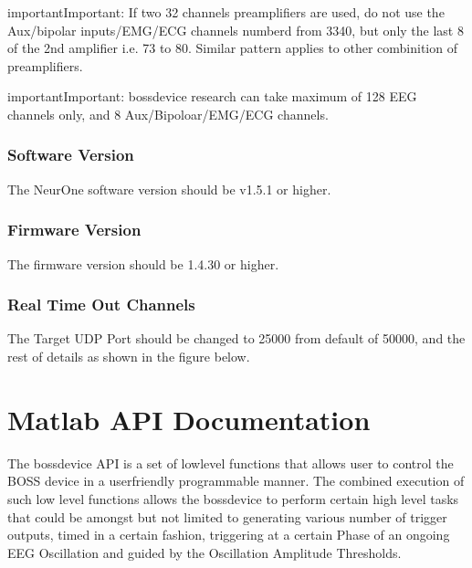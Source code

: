 \documentclass[letterpaper,10pt,english]{sphinxmanual}
\begin{document}
\begin{sphinxadmonition}{important}{Important:}
If two 32 channels preamplifiers are used, do not use the Aux/bipolar inputs/EMG/ECG channels numberd from 33\sphinxhyphen{}40, but only the last 8 of the 2nd amplifier i.e. 73 to 80. Similar pattern applies to other combinition of preamplifiers.
\end{sphinxadmonition}

\begin{sphinxadmonition}{important}{Important:}
bossdevice research can take maximum of 128 EEG channels only, and 8 Aux/Bipoloar/EMG/ECG channels.
\end{sphinxadmonition}


\subsection{Software Version}
\label{\detokenize{3_setup_biosignal_amplifier:software-version}}
The NeurOne software version should be v1.5.1 or higher.

\begin{figure}[htbp]
\centering

\noindent{}
\end{figure}


\subsection{Firmware Version}
\label{\detokenize{3_setup_biosignal_amplifier:firmware-version}}
The firmware version should be 1.4.30 or higher.


\subsection{Real Time Out Channels}
\label{\detokenize{3_setup_biosignal_amplifier:real-time-out-channels}}
The Target UDP Port should be changed to 25000 from default of 50000, and the rest of details as shown in the figure below.

\begin{figure}[htbp]
\centering

\noindent{}
\end{figure}


\chapter{Matlab API Documentation}
\label{\detokenize{4_api_documentation:matlab-api-documentation}}\label{\detokenize{4_api_documentation::doc}}
The bossdevice API is a set of low\sphinxhyphen{}level functions that allows user to control the BOSS device in a user\sphinxhyphen{}friendly programmable manner. The combined execution of such low level functions allows the bossdevice to perform certain high level tasks that could be amongst but not limited to generating various number of trigger outputs, timed in a certain fashion, triggering at a certain Phase of an ongoing EEG Oscillation and guided by the Oscillation Amplitude Thresholds.
\end{document}
